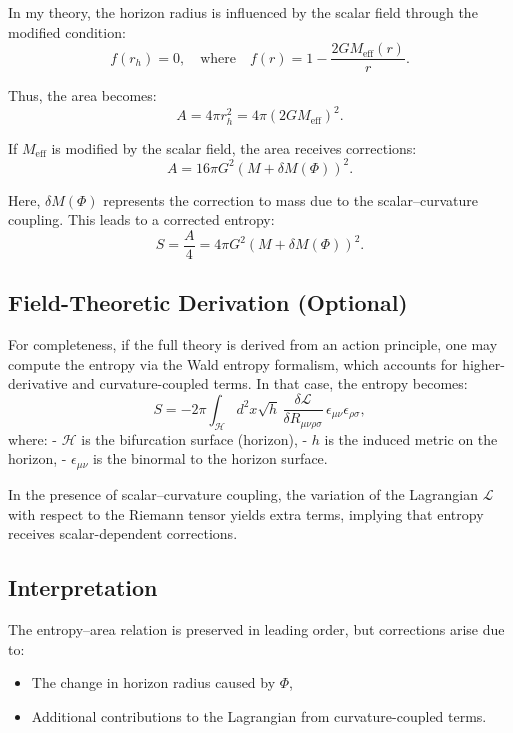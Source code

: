 \documentclass[12pt]{article}
\begin{document}
In my theory, the horizon radius is influenced by the scalar field through the modified condition:
\begin{equation}
f(r_h) = 0, \quad \text{where} \quad f(r) = 1 - \frac{2GM_{\text{eff}}(r)}{r}.
\end{equation}

Thus, the area becomes:
\begin{equation}
A = 4\pi r_h^2 = 4\pi \left( 2GM_{\text{eff}} \right)^2.
\end{equation}

If \( M_{\text{eff}} \) is modified by the scalar field, the area receives corrections:
\[
A = 16\pi G^2 \left( M + \delta M(\Phi) \right)^2.
\]

Here, \( \delta M(\Phi) \) represents the correction to mass due to the scalar–curvature coupling. This leads to a corrected entropy:
\begin{equation}
S = \frac{A}{4} = 4\pi G^2 \left( M + \delta M(\Phi) \right)^2.
\end{equation}

\subsection{Field-Theoretic Derivation (Optional)}

For completeness, if the full theory is derived from an action principle, one may compute the entropy via the Wald entropy formalism, which accounts for higher-derivative and curvature-coupled terms. In that case, the entropy becomes:
\begin{equation}
S = -2\pi \int_{\mathcal{H}} d^2x \sqrt{h} \, \frac{\delta \mathcal{L}}{\delta R_{\mu\nu\rho\sigma}} \, \epsilon_{\mu\nu} \epsilon_{\rho\sigma},
\end{equation}
where:
- \( \mathcal{H} \) is the bifurcation surface (horizon),
- \( h \) is the induced metric on the horizon,
- \( \epsilon_{\mu\nu} \) is the binormal to the horizon surface.

In the presence of scalar–curvature coupling, the variation of the Lagrangian \( \mathcal{L} \) with respect to the Riemann tensor yields extra terms, implying that entropy receives scalar-dependent corrections.

\subsection{Interpretation}

The entropy–area relation is preserved in leading order, but corrections arise due to:
\begin{itemize}
    \item The change in horizon radius caused by \( \Phi \),
    \item Additional contributions to the Lagrangian from curvature-coupled terms.
\end{itemize}
\end{document}
